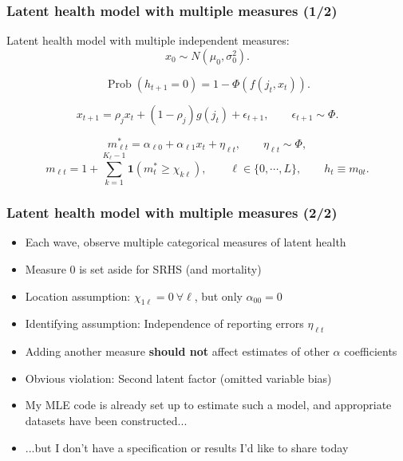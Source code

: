 \documentclass[aspectratio=169]{beamer}
\newcommand{\Prob}{\operatorname{Prob}}
\begin{document}
\begin{frame}\frametitle{Latent health model with multiple measures (1/2)}
Latent health model with multiple independent measures:
\setcounter{equation}{0}
\begin{equation}
x_0 \sim N(\mu_0, \sigma^2_0).
\end{equation}

\begin{equation}
\Prob(h_{t+1} = 0) = 1 - \Phi(f(j_t,x_t)).
\end{equation}

\begin{equation}
x_{t+1} = \rho_{j} x_t + (1-\rho_j)g(j_t) + \epsilon_{t+1}, \qquad \epsilon_{t+1} \sim \Phi.
\end{equation}

\begin{equation}
m^*_{\ell t} = \alpha_{\ell 0} + \alpha_{\ell 1} x_t + \eta_{\ell t}, \qquad \eta_{\ell t} \sim \Phi,
\end{equation}
\begin{equation*}
m_{\ell t} = 1 + \sum_{k = 1}^{K_{\ell}-1} \mathbf{1}(m^*_t \geq \chi_{k\ell}), \qquad \ell \in \{0,\cdots,L\}, \qquad h_t \equiv m_{0t}.
\end{equation*}
\end{frame}


\begin{frame}\frametitle{Latent health model with multiple measures (2/2)}
\begin{itemize}
	\item <1->Each wave, observe multiple categorical measures of latent health
	
	\item <1->Measure 0 is set aside for SRHS (and mortality)
	
	\item <1->Location assumption: $\chi_{1\ell} = 0 ~ \forall \ell$, but only $\alpha_{00} = 0$
	
	\item <2->Identifying assumption: Independence of reporting errors $\eta_{\ell t}$
	
	\item <2->Adding another measure \textbf{should not} affect estimates of other $\alpha$ coefficients
	
	\item <3->Obvious violation: Second latent factor (omitted variable bias)
	
	\item <4->My MLE code is already set up to estimate such a model, and appropriate datasets have been constructed...
	
	\item <4->...but I don't have a specification or results I'd like to share today
\end{itemize}
\end{frame}
\end{document}
